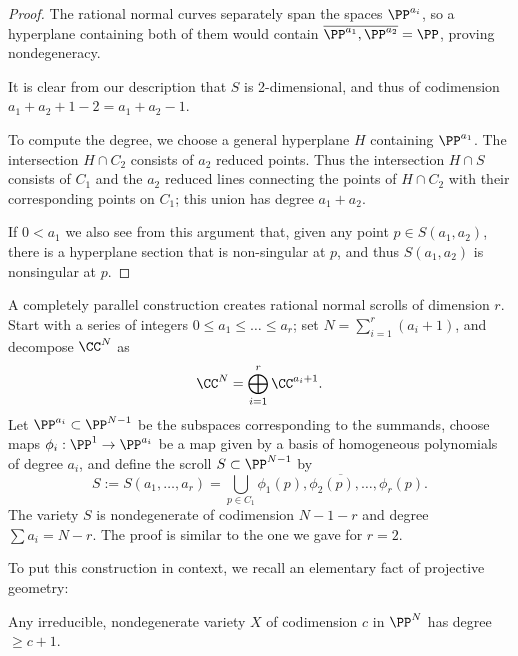 \begin{proof}
 The rational normal curves separately span the spaces $\PP^{a_i}$, so a hyperplane containing both of them would contain $\overline{\PP^{a_1}, \PP^{a_{2}}} = \PP$, proving nondegeneracy. 
 
 It is clear from our description that $S$ is 2-dimensional, and thus of
codimension $a_{1}+a_{2}+1 -2 = a_{1}+a_{2}-1$. 

To compute the degree, we choose a general hyperplane $H$ containing $\PP^{a_{1}}$. The intersection $H\cap C_{2}$ consists of $a_{2}$ reduced points. Thus the intersection $H\cap S$ consists of $C_{1}$ and the $a_{2}$ reduced lines connecting 
the points of $H\cap C_{2}$ with their corresponding points on $C_{1}$; this union has degree $a_{1}+a_{2}$.

If $0< a_{1}$ we also see from this argument that, given any point  $p\in S(a_{1},a_{2})$, there is
a hyperplane section that is non-singular at $p$, and thus $S(a_{1},a_{2})$ is nonsingular at $p$.
\end{proof}

A completely parallel construction creates rational normal scrolls of dimension $r$. Start with a series of integers $0 \leq a_1 \leq \dots \leq a_r$;
set $N = \sum_{i=1}^{r}(a_{i}+1)$,  and
decompose $\CC^{N}$ as
$$
\CC^{N} = \bigoplus_{i=1}^{r}\CC^{a_{i}+1}.
$$
Let $\PP^{a_{i}}\subset \PP^{N-1}$ be the subspaces corresponding to the summands,  choose
maps $\phi_i : \PP^1 \to \PP^{a_{i}}$ be a map given by a basis of homogeneous polynomials of degree $a_i$, and define the scroll $S \subset \PP^{N-1}$ by
$$
S:=S(a_{1}, \dots, a_{r}) = \bigcup_{p\in C_{1}}\overline{\phi_1(p), \phi_{2}(p), \dots, \phi_{r}(p)}.
$$
The variety $S$ is nondegenerate of codimension $N-1-r$ and degree $\sum a_{i} = N-r$. The proof is similar to the one we gave for $r=2$.


To put this construction in context, we recall an elementary fact of projective geometry:
 
\begin{proposition}\label{minimal degree}
 Any irreducible, nondegenerate variety $X$ of codimension $c$ in $\PP^{N}$ has degree $\geq c +1$.
\end{proposition}

